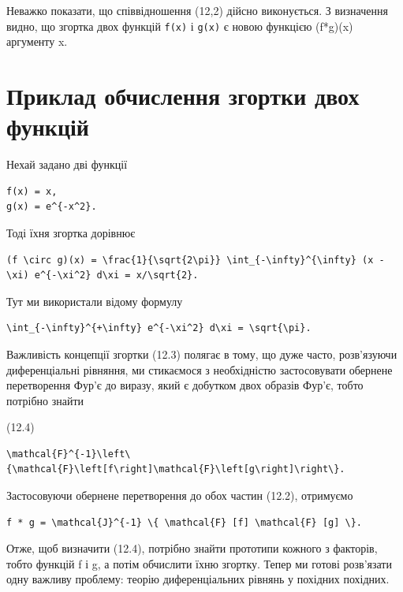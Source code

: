 \documentclass[
  ukrainian,
]{article}
\begin{document}
Неважко показати, що співвідношення (12,2) дійсно виконується. З
визначення видно, що згортка двох функцій \texttt{f(x)} і \texttt{g(x)}
є новою функцією (f*g)(x) аргументу x.

\section{Приклад обчислення згортки двох
функцій}\label{ux43fux440ux438ux43aux43bux430ux434-ux43eux431ux447ux438ux441ux43bux435ux43dux43dux44f-ux437ux433ux43eux440ux442ux43aux438-ux434ux432ux43eux445-ux444ux443ux43dux43aux446ux456ux439}

Нехай задано дві функції

\begin{verbatim}
f(x) = x,
g(x) = e^{-x^2}.
\end{verbatim}

Тоді їхня згортка дорівнює

\begin{verbatim}
(f \circ g)(x) = \frac{1}{\sqrt{2\pi}} \int_{-\infty}^{\infty} (x - \xi) e^{-\xi^2} d\xi = x/\sqrt{2}.
\end{verbatim}

Тут ми використали відому формулу

\begin{verbatim}
\int_{-\infty}^{+\infty} e^{-\xi^2} d\xi = \sqrt{\pi}.
\end{verbatim}

Важливість концепції згортки (12.3) полягає в тому, що дуже часто,
розв'язуючи диференціальні рівняння, ми стикаємося з необхідністю
застосовувати обернене перетворення Фур'є до виразу, який є добутком
двох образів Фур'є, тобто потрібно знайти

(12.4)

\begin{verbatim}
\mathcal{F}^{-1}\left\{\mathcal{F}\left[f\right]\mathcal{F}\left[g\right]\right\}.
\end{verbatim}

Застосовуючи обернене перетворення до обох частин (12.2), отримуємо

\begin{verbatim}
f * g = \mathcal{J}^{-1} \{ \mathcal{F} [f] \mathcal{F} [g] \}.
\end{verbatim}

Отже, щоб визначити (12.4), потрібно знайти прототипи кожного з
факторів, тобто функцій f і g, а потім обчислити їхню згортку. Тепер ми
готові розв'язати одну важливу проблему: теорію диференціальних рівнянь
у похідних похідних.
\end{document}
